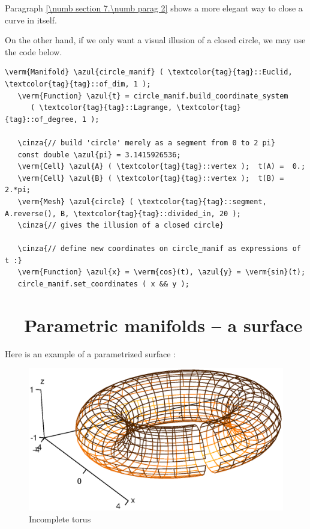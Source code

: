 Paragraph \ref{\numb section 7.\numb parag 2} shows a more elegant way to close a curve in itself.

On the other hand, if we only want a visual illusion of a closed circle, we may use the code below.

\begin{Verbatim}[commandchars=\\\{\},formatcom=\small\tt,baselinestretch=0.94]
   \verm{Manifold} \azul{circle_manif} ( \textcolor{tag}{tag}::Euclid, \textcolor{tag}{tag}::of_dim, 1 );
   \verm{Function} \azul{t} = circle_manif.build_coordinate_system
      ( \textcolor{tag}{tag}::Lagrange, \textcolor{tag}{tag}::of_degree, 1 );

   \cinza{// build 'circle' merely as a segment from 0 to 2 pi}
   const double \azul{pi} = 3.1415926536;
   \verm{Cell} \azul{A} ( \textcolor{tag}{tag}::vertex );  t(A) =  0.;
   \verm{Cell} \azul{B} ( \textcolor{tag}{tag}::vertex );  t(B) =  2.*pi;
   \verm{Mesh} \azul{circle} ( \textcolor{tag}{tag}::segment, A.reverse(), B, \textcolor{tag}{tag}::divided_in, 20 );
   \cinza{// gives the illusion of a closed circle}

   \cinza{// define new coordinates on circle_manif as expressions of t :}
   \verm{Function} \azul{x} = \verm{cos}(t), \azul{y} = \verm{sin}(t);
   circle_manif.set_coordinates ( x && y );
\end{Verbatim}


\section{~~Parametric manifolds -- a surface}\label{\numb section 2.\numb parag 16}

Here is an example of a parametrized surface :

\begin{figure}[ht] \centering
  \includegraphics[width=125mm]{torus}
  \caption{Incomplete torus}
\end{figure}

